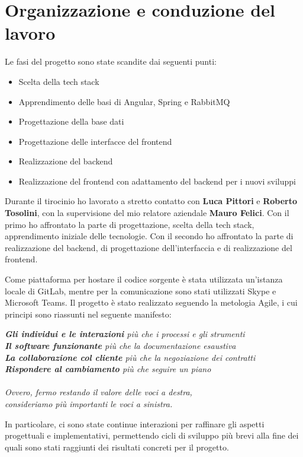 \section{Organizzazione e conduzione del lavoro}
Le fasi del progetto sono state scandite dai seguenti punti:
\begin{itemize}
  \item Scelta della tech stack
  \item Apprendimento delle basi di Angular, Spring e RabbitMQ
  \item Progettazione della base dati
  \item Progettazione delle interfacce del frontend
  \item Realizzazione del backend
  \item Realizzazione del frontend con adattamento del backend per i nuovi sviluppi
\end{itemize}
Durante il tirocinio ho lavorato a stretto contatto con \textbf{Luca Pittori} e \textbf{Roberto Tosolini}, con la supervisione del mio relatore aziendale \textbf{Mauro Felici}.
Con il primo ho affrontato la parte di progettazione, scelta della tech stack, apprendimento iniziale delle tecnologie. Con il secondo ho affrontato la parte di realizzazione del backend,
di progettazione dell'interfaccia e di realizzazione del frontend.

Come piattaforma per hostare il codice sorgente \`e stata utilizzata un'istanza locale di GitLab, mentre per la comunicazione sono stati utilizzati Skype e Microsoft Teams.
Il progetto \`e stato realizzato seguendo la metologia Agile, i cui principi sono riassunti nel seguente manifesto\cite{beck2001manifesto}:

\textit{\textbf{Gli individui e le interazioni} pi\`u che i processi e gli strumenti\\
  \textbf{Il software funzionante} pi\`u che la documentazione esaustiva\\
  \textbf{La collaborazione col cliente} pi\`u che la negoziazione dei contratti\\
  \textbf{Rispondere al cambiamento} pi\`u che seguire un piano\\\\
  Ovvero, fermo restando il valore delle voci a destra,\\
  consideriamo pi\`u importanti le voci a sinistra.
}

In particolare, ci sono state continue interazioni per raffinare gli aspetti progettuali e implementativi, permettendo cicli di sviluppo pi\`u brevi alla fine dei quali
sono stati raggiunti dei risultati concreti per il progetto.
